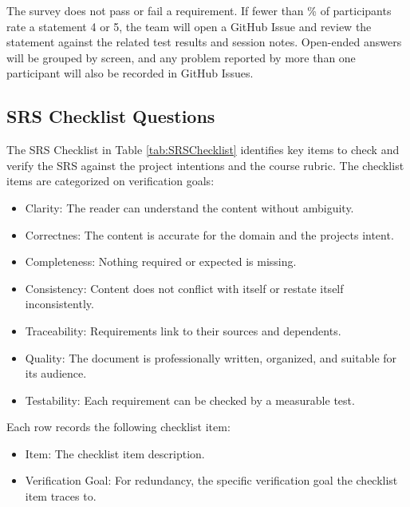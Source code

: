 \documentclass[10pt,titlepage]{article}
\newcommand{\constref}[1]{\hyperlink{const:#1}{\texttt{\detokenize{#1}}}}
\begin{document}
The survey does not pass or fail a requirement. If fewer than
\constref{SURVEY_AGREE_RATE_MIN}\% of participants rate a statement 4 or 5, the
team will open a GitHub Issue and review the statement against the related test
results and session notes. Open-ended answers will be grouped by screen, and any
problem reported by more than one participant will also be recorded in GitHub
Issues.

\subsection{SRS Checklist Questions}\label{sec:SRSChecklistQuestions}

The SRS Checklist in Table \ref{tab:SRSChecklist} identifies key items to check and verify the SRS against the project intentions and the course rubric. The checklist 
items are categorized on verification goals:
\begin{itemize}
  \item Clarity: The reader can understand the content without ambiguity.
  \item Correctnes: The content is accurate for the domain and the projects intent.
  \item Completeness:	Nothing required or expected is missing.
  \item Consistency: Content does not conflict with itself or restate itself inconsistently.
  \item Traceability: Requirements link to their sources and dependents.
  \item Quality: The document is professionally written, organized, and suitable for its audience.
  \item Testability: Each requirement can be checked by a measurable test.
\end{itemize}
Each row records the following checklist item:
\begin{itemize}
  \item Item: The checklist item description.
  \item Verification Goal: For redundancy, the specific verification goal the checklist item traces to.
\end{itemize}
\end{document}
